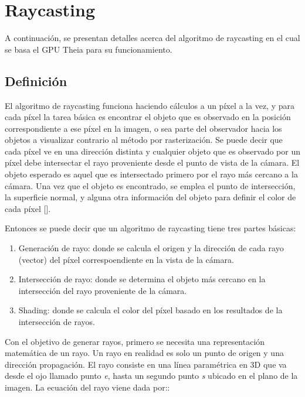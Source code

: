 \section{Raycasting}

A continuación, se presentan detalles acerca del algoritmo de raycasting en el cual se basa el GPU Theia para su funcionamiento.

\subsection{Definición}

El algoritmo de raycasting funciona haciendo cálculos a un píxel a la vez, y para cada píxel la tarea básica es encontrar el objeto que es observado en la posición correspondiente a ese píxel en la imagen, o sea parte del observador hacia los objetos a visualizar contrario al método por rasterización. Se puede decir que cada píxel ve en una dirección distinta y cualquier objeto que es observado por un píxel debe intersectar el rayo proveniente desde el punto de vista de la cámara. El objeto esperado es aquel que es intersectado primero por el rayo más cercano a la cámara. Una vez que el objeto es encontrado, se emplea el punto de intersección, la superficie normal, y alguna otra información del objeto para definir el color de cada píxel [\cite{Shirley2009}]. 

Entonces se puede decir que un algoritmo de raycasting tiene tres partes básicas:

\begin{enumerate}

\item Generación de rayo: donde se calcula el origen y la dirección de cada rayo (vector) del píxel correspoendiente en la vista de la cámara.
\item Intersección de rayo: donde se determina el objeto más cercano en la intersección del rayo proveniente de la cámara.
\item Shading: donde se calcula el color del píxel basado en los resultados de la intersección de rayos.

\end{enumerate}

Con el objetivo de generar rayos, primero se necesita una representación matemática de un rayo. Un rayo en realidad es solo un punto de origen y una dirección propagación. El rayo consiste en una línea paramétrica en 3D que va desde el ojo llamado punto \textit{e}, hasta un segundo punto \textit{s} ubicado en el plano de la imagen. La ecuación del rayo viene dada por:: 

